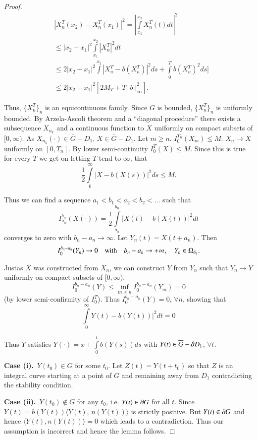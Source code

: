 \begin{proof}
\begin{align*}
& |X^{T}_{n}(x_{2})-X^{T}_{n}(x_{1})|^{2}=|\int\limits^{x_{2}}_{x_{1}}X^{T}_{n}(t)dt|^{2}\\ 
& \leq |x_{2}-x_{1}|^{2}\int\limits^{x_{2}}_{x_{1}}|X^{T}_{n}|^{2}dt\\
&\leq 2|x_{2}-x_{1}|^{2}\int\limits^{x_{2}}|X^{T}_{n}-b(X^{T}_{n})|^{2}ds+\int\limits^{T}_{0}b(X^{T}_{n})^{2}ds]\\
&\leq 2|x_{2}-x_{1}|^{2}[2M_{T}+T||b||^{2}_{\infty}].
\end{align*}

Thus, $\{X^{T}_{n}\}_{n}$ is an equicontinuous family. Since
$\overline{G}$ is bounded, $\{X^{T}_{n}\}_{n}$ is uniformly
bounded. By Arzela-Ascoli theorem and a ``diagonal procedure'' there
exists a subsequence $X_{n_{k}}$ and a continuous function to $X$
uniformly on compact subsets of $[0,\infty)$. As $X_{n_{k}}(\cdot)\in
  \overline{G}-D_{1}$, $X\in \overline{G}-D_{1}$. Let $m\geq
  n$. $I^{T_{n}}_{0}(X_{m})\leq M$. $X_{n}\to X$ uniformly on
  $[0,T_{n}]$. By lower semi-continuity $I^{T}_{0}(X)\leq M$. Since
  this is true for every $T$ we get on letting $T$ tend to $\infty$,
  that
$$
\frac{1}{2}\int\limits^{\infty}_{0}|X-b(X(s))|^{2}ds\le M.
$$

Thus we can find a sequence $a_{1}<b_{1}<a_{2}<b_{2}<\ldots$ such that
$$
I^{b_{n}}_{a_{n}}(X(\cdot))=\frac{1}{2}\int\limits^{b_{n}}_{a_{n}}|X(t)-b(X(t))|^{2}dt
$$
converges to zero with $b_{n}-a_{n}\to \infty$. Let
$Y_{n}(t)=X(t+a_{n})$. Then
$$
I^{b_{n}-a_{n}}_{0}(Y_{n})\to 0\quad\text{with}\quad b_{n}-a_{n}\to
+\infty,\quad Y_{n}\in \Omega_{\delta_{1}}.
$$

Just\pageoriginale as $X$ was constructed from $X_{n}$, we can
construct $Y$ from $Y_{n}$ such that $Y_{n}\to Y$ uniformly on compact
subsets of $[0,\infty)$. 
$$
I^{b_{n}-a_{n}}_{0}(Y)\leq \inf\limits_{m\geq
  n}I^{b_{n}-a_{n}}_{0}(Y_{m})=0
$$
(by lower semi-confirmity of $I^{T}_{0}$). Thus
$I^{b_{n}-a_{n}}_{0}(Y)=0$, $\forall n$, showing that
$$
\int\limits^{\infty}_{0}Y(t)-b(Y(t))|^{2}dt=0
$$

Thus $Y$ satisfies $Y(\cdot)=x+\int\limits^{t}_{0}b(Y(s))ds$ with
$Y(t)\in\overline{G}-\partial D_{1}$, $\forall t$.

\medskip
\noindent
{\bf Case (i).}~$Y(t_{0})\in G$ for some $t_0$. Let $Z(t)=Y(t+t_{0})$
so that $Z$ is an integral curve starting at a point of $G$ and
remaining away from $D_{1}$ contradicting the stability condition.
\medskip

\noindent
{\bf Case (ii).}~$Y(t_{0})\not\in G$ for any $t_{0}$, i.e. $Y(t)\in \partial
G$ for all $t$. Since $Y(t)=b(Y(t))\langle Y(t)$, $n(Y(t))\rangle$ is
strictly positive. But $Y(t)\in \partial G$ and hence $\langle Y(t),
n(Y(t))\rangle =0$ which leads to a contradiction. Thus our assumption
is incorrect and hence the lemma follows.
\end{proof}

